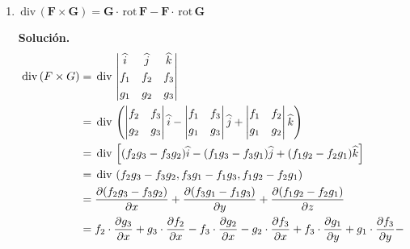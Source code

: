 \documentclass[fleqn, 12pt]{article}
\newcommand{\derivadaparcial}[2]{\dfrac{\partial {#1}}{\partial {#2}}}
\newcommand{\rot}{\mathrm{\, rot \,}}
\newcommand{\dive}{\mathrm{\, div \,}}
\begin{document}
\begin{enumerate}
        \item $ \mathbf{\dive (F \times G) = G \cdot \rot F - F \cdot \rot G} $
        
        \textbf{Solución.}
        \begin{align*}
            \dive (F \times G) &= \dive \left\lvert 
            \begin{matrix}
                \widehat{i} & \widehat{j} & \widehat{k} \vspace{1mm} \\
                f_1 & f_2 & f_3 \vspace{1mm} \\
                g_1 & g_2 & g_3
            \end{matrix} \right\rvert \\
            &= \dive \left( \left\lvert 
            \begin{matrix}
                f_2 & f_3 \vspace{1mm} \\
                g_2 & g_3
            \end{matrix} \right\rvert \widehat{i} - \left\lvert 
            \begin{matrix}
                f_1 & f_3 \vspace{1mm} \\
                g_1 & g_3
            \end{matrix} \right\rvert \widehat{j} + \left\lvert 
            \begin{matrix}
                f_1 & f_2 \vspace{1mm} \\
                g_1 & g_2
            \end{matrix} \right\rvert \widehat{k} \right) \\
            &= \dive \left[ (f_2 g_3 - f_3 g_2) \widehat{i} - (f_1 g_3 - f_3 g_1) \widehat{j} + (f_1 g_2 - f_2 g_1) \widehat{k} \right] \\
            &= \dive \left( f_2 g_3 - f_3 g_2, f_3 g_1 - f_1 g_3, f_1 g_2 - f_2 g_1 \right) \\
            &= \derivadaparcial{(f_2 g_3 - f_3 g_2)}{x} + \derivadaparcial{(f_3 g_1 - f_1 g_3)}{y} + \derivadaparcial{(f_1 g_2 - f_2 g_1)}{z} \\
            &= f_2 \cdot \derivadaparcial{g_3}{x} + g_3 \cdot \derivadaparcial{f_2}{x} - f_3 \cdot \derivadaparcial{g_2}{x} - g_2 \cdot \derivadaparcial{f_3}{x} + f_3 \cdot \derivadaparcial{g_1}{y} + g_1 \cdot \derivadaparcial{f_3}{y} - \\

\end{align*}
\end{enumerate}
\end{document}
